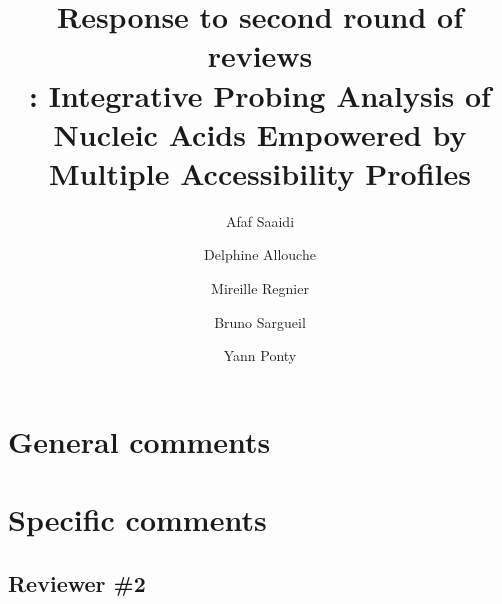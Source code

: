 \documentclass[9pt,hyperref]{article} %
\title{Response to second round of reviews\\[.3em]\OurTool{}:  Integrative Probing Analysis of Nucleic Acids Empowered by Multiple Accessibility Profiles}
\author{
Afaf Saaidi \and
Delphine Allouche \and
Mireille Regnier \and
Bruno Sargueil \and
Yann Ponty}
\date{} %
\begin{document}
\maketitle

\tableofcontents

\section{General comments}

\section{Specific comments}

	\subsection{Reviewer \#2}
\end{document}
